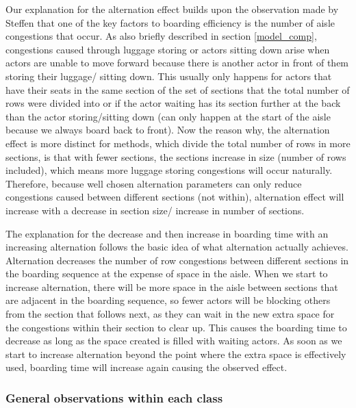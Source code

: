 \documentclass[11pt]{article}
\begin{document}
 
 Our explanation for the alternation effect builds upon the observation made by Steffen \cite{steffen} that one of the key factors to boarding efficiency is the number of aisle congestions that occur. As also briefly described in section \ref{model_comp}, congestions caused through luggage storing or actors sitting down arise when actors are unable to move forward because there is another actor in front of them storing their luggage/ sitting down. This usually only happens for actors that have their seats in the same section of the set of sections that the total number of rows were divided into or if the actor waiting has its section further at the back than the actor storing/sitting down (can only happen at the start of the aisle because we always board back to front). Now the reason why, the alternation effect is more distinct for methods, which divide the total number of rows in more sections, is that with fewer sections, the sections increase in size (number of rows included), which means more luggage storing congestions will occur naturally. Therefore, because well chosen alternation parameters can only reduce congestions caused between different sections (not within), alternation effect will increase with a decrease in section size/ increase in number of sections.
 
 The explanation for the decrease and then increase in boarding time with an increasing alternation follows the basic idea of what alternation actually achieves. Alternation decreases the number of row congestions between different sections in the boarding sequence at the expense of space in the aisle. When we start to increase alternation, there will be more space in the aisle between sections that are adjacent in the boarding sequence, so fewer actors will be blocking others from the section that follows next, as they can wait in the new extra space for the congestions within their section to clear up. 
 This causes the boarding time to decrease as long as the space created is filled with waiting actors. As soon as we start to increase alternation beyond the point where the extra space is effectively used, boarding time will increase again causing the observed effect.
 
  \subsubsection{General observations within each class}
\end{document}
